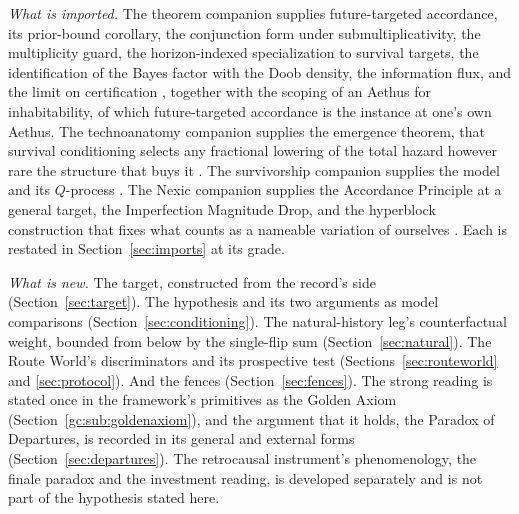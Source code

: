 \emph{What is imported.} The theorem companion supplies future-targeted
accordance, its prior-bound corollary, the conjunction form under
submultiplicativity, the multiplicity guard, the horizon-indexed
specialization to survival targets, the identification of the Bayes factor
with the Doob density, the information flux, and the limit on
certification \cite{GoldenTargeted}, together with the scoping of an
Aethus for inhabitability, of which future-targeted accordance is the
instance at one's own Aethus. The technoanatomy companion supplies the
emergence theorem, that survival conditioning selects any fractional
lowering of the total hazard however rare the structure that buys it
\cite{GoldenTechnoanatomy}. The survivorship companion supplies the
model and its $Q$-process \cite{GoldenSurvivorship}. The Nexic companion supplies the
Accordance Principle at a general target, the Imperfection Magnitude Drop,
and the hyperblock construction that fixes what counts as a nameable
variation of ourselves \cite{Nexus}. Each is restated in
Section~\ref{sec:imports} at its grade.

\emph{What is new.} The target, constructed from the record's side
(Section~\ref{sec:target}). The hypothesis and its two arguments as model
comparisons (Section~\ref{sec:conditioning}). The natural-history leg's counterfactual weight, bounded from below by the single-flip sum (Section~\ref{sec:natural}). The Route World's discriminators and its prospective test (Sections~\ref{sec:routeworld} and \ref{sec:protocol}). And the fences (Section~\ref{sec:fences}). The strong reading is stated
once in the framework's primitives as the Golden Axiom
(Section~\ref{gc:sub:goldenaxiom}), and the argument that it
holds, the Paradox of Departures, is recorded in its general and external
forms (Section~\ref{sec:departures}). The retrocausal instrument's phenomenology, the finale paradox and the investment reading, is developed separately and is not part of the hypothesis stated here.


